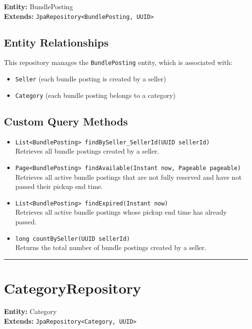 \documentclass[12pt]{article}
\begin{document}
\textbf{Entity:} BundlePosting \\
\textbf{Extends:} \texttt{JpaRepository<BundlePosting, UUID>}

\subsection*{Entity Relationships}
This repository manages the \texttt{BundlePosting} entity, which is associated with:
\begin{itemize}
    \item \texttt{Seller} (each bundle posting is created by a seller)
    \item \texttt{Category} (each bundle posting belongs to a category)
\end{itemize}

\subsection*{Custom Query Methods}
\begin{itemize}
    \item \texttt{List<BundlePosting> findBySeller\_SellerId(UUID sellerId)} \\
    Retrieves all bundle postings created by a seller.

    \item \texttt{Page<BundlePosting> findAvailable(Instant now, Pageable pageable)} \\
    Retrieves all active bundle postings that are not fully reserved and have not passed their pickup end time.

    \item \texttt{List<BundlePosting> findExpired(Instant now)} \\
    Retrieves all active bundle postings whose pickup end time has already passed.

    \item \texttt{long countBySeller(UUID sellerId)} \\
    Returns the total number of bundle postings created by a seller.
\end{itemize}

\hrule
\vspace{1em}

\section{CategoryRepository}

\textbf{Entity:} Category \\
\textbf{Extends:} \texttt{JpaRepository<Category, UUID>}
\end{document}

